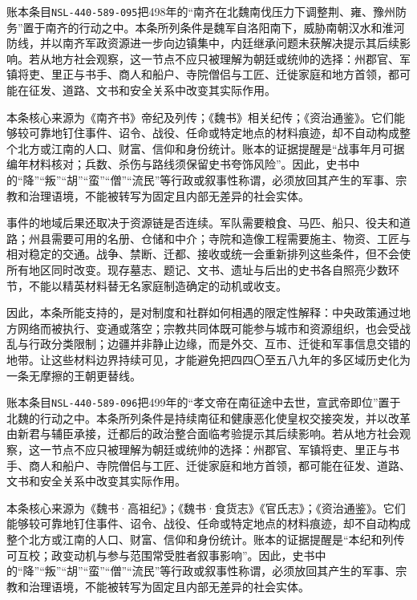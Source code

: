 账本条目\texttt{NSL-440-589-095}把498年的“南齐在北魏南伐压力下调整荆、雍、豫州防务”置于南齐的行动之中。本条所列条件是魏军自洛阳南下，威胁南朝汉水和淮河防线，并以南齐军政资源进一步向边镇集中，内廷继承问题未获解决提示其后续影响。若从地方社会观察，这一节点不应只被理解为朝廷或统帅的选择：州郡官、军镇将吏、里正与书手、商人和船户、寺院僧侣与工匠、迁徙家庭和地方首领，都可能在征发、道路、文书和安全关系中改变其实际作用。

本条核心来源为《南齐书》帝纪及列传；《魏书》相关纪传；《资治通鉴》。它们能够较可靠地钉住事件、诏令、战役、任命或特定地点的材料痕迹，却不自动构成整个北方或江南的人口、财富、信仰和身份统计。账本的证据提醒是“战事年月可据编年材料核对；兵数、杀伤与路线须保留史书夸饰风险”。因此，史书中的“降”“叛”“胡”“蛮”“僧”“流民”等行政或叙事性称谓，必须放回其产生的军事、宗教和治理语境，不能被转写为固定且内部无差异的社会实体。

事件的地域后果还取决于资源链是否连续。军队需要粮食、马匹、船只、役夫和道路；州县需要可用的名册、仓储和中介；寺院和造像工程需要施主、物资、工匠与相对稳定的交通。战争、禁断、迁都、接收或统一会重新排列这些条件，但不会使所有地区同时改变。现存墓志、题记、文书、遗址与后出的史书各自照亮少数环节，不能以精英材料替无名家庭制造确定的动机或收支。

因此，本条所能支持的，是对制度和社群如何相遇的限定性解释：中央政策通过地方网络而被执行、变通或落空；宗教共同体既可能参与城市和资源组织，也会受战乱与行政分类限制；边疆并非静止边缘，而是外交、互市、迁徙和军事信息交错的地带。让这些材料边界持续可见，才能避免把四四〇至五八九年的多区域历史化为一条无摩擦的王朝更替线。

账本条目\texttt{NSL-440-589-096}把499年的“孝文帝在南征途中去世，宣武帝即位”置于北魏的行动之中。本条所列条件是持续南征和健康恶化使皇权交接突发，并以改革由新君与辅臣承接，迁都后的政治整合面临考验提示其后续影响。若从地方社会观察，这一节点不应只被理解为朝廷或统帅的选择：州郡官、军镇将吏、里正与书手、商人和船户、寺院僧侣与工匠、迁徙家庭和地方首领，都可能在征发、道路、文书和安全关系中改变其实际作用。

本条核心来源为《魏书·高祖纪》；《魏书·食货志》《官氏志》；《资治通鉴》。它们能够较可靠地钉住事件、诏令、战役、任命或特定地点的材料痕迹，却不自动构成整个北方或江南的人口、财富、信仰和身份统计。账本的证据提醒是“本纪和列传可互校；政变动机与参与范围常受胜者叙事影响”。因此，史书中的“降”“叛”“胡”“蛮”“僧”“流民”等行政或叙事性称谓，必须放回其产生的军事、宗教和治理语境，不能被转写为固定且内部无差异的社会实体。

